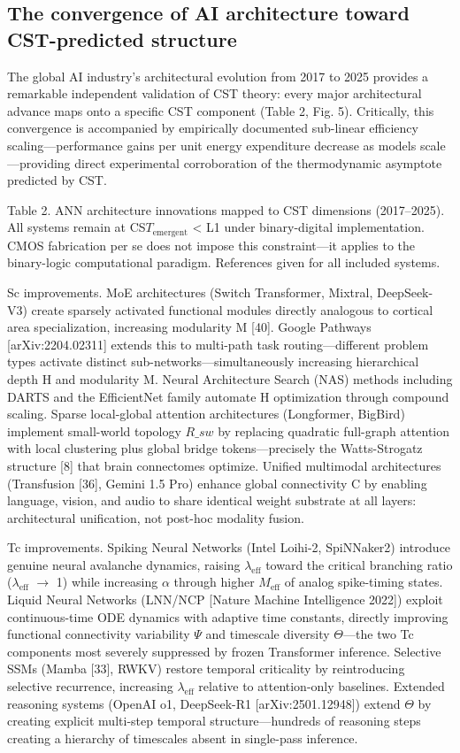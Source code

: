 \documentclass[a4paper,12pt]{article}
\begin{document}
\subsection{The convergence of AI architecture toward CST-predicted structure}

The global AI industry's architectural evolution from 2017 to 2025 provides a remarkable independent validation of CST theory: every major architectural advance maps onto a specific CST component (Table 2, Fig. 5). Critically, this convergence is accompanied by empirically documented sub-linear efficiency scaling---performance gains per unit energy expenditure decrease as models scale---providing direct experimental corroboration of the thermodynamic asymptote predicted by CST.


Table 2. ANN architecture innovations mapped to CST dimensions (2017--2025). All systems remain at CS$T_{\text{emergent}}$ < L1 under binary-digital implementation. CMOS fabrication per se does not impose this constraint---it applies to the binary-logic computational paradigm. References given for all included systems.


Sc improvements. MoE architectures (Switch Transformer, Mixtral, DeepSeek-V3) create sparsely activated functional modules directly analogous to cortical area specialization, increasing modularity M [40]. Google Pathways [arXiv:2204.02311] extends this to multi-path task routing---different problem types activate distinct sub-networks---simultaneously increasing hierarchical depth H and modularity M. Neural Architecture Search (NAS) methods including DARTS and the EfficientNet family automate H optimization through compound scaling. Sparse local-global attention architectures (Longformer, BigBird) implement small-world topology $R\_{sw}$ by replacing quadratic full-graph attention with local clustering plus global bridge tokens---precisely the Watts-Strogatz structure [8] that brain connectomes optimize. Unified multimodal architectures (Transfusion [36], Gemini 1.5 Pro) enhance global connectivity C by enabling language, vision, and audio to share identical weight substrate at all layers: architectural unification, not post-hoc modality fusion.


Tc improvements. Spiking Neural Networks (Intel Loihi-2, SpiNNaker2) introduce genuine neural avalanche dynamics, raising $\lambda_{\text{eff}}$ toward the critical branching ratio ($\lambda_{\text{eff}}$ $\rightarrow$ 1) while increasing $\alpha$ through higher $M_{\text{eff}}$ of analog spike-timing states. Liquid Neural Networks (LNN/NCP [Nature Machine Intelligence 2022]) exploit continuous-time ODE dynamics with adaptive time constants, directly improving functional connectivity variability $\Psi$ and timescale diversity $\Theta$---the two Tc components most severely suppressed by frozen Transformer inference. Selective SSMs (Mamba [33], RWKV) restore temporal criticality by reintroducing selective recurrence, increasing $\lambda_{\text{eff}}$ relative to attention-only baselines. Extended reasoning systems (OpenAI o1, DeepSeek-R1 [arXiv:2501.12948]) extend $\Theta$ by creating explicit multi-step temporal structure---hundreds of reasoning steps creating a hierarchy of timescales absent in single-pass inference.
\end{document}
